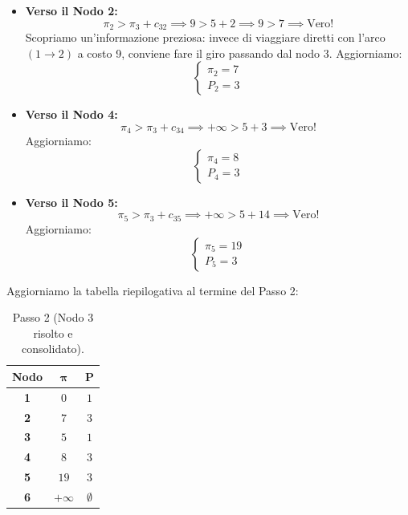 \documentclass[12pt, a4paper]{article}
\begin{document}
	\begin{itemize}
		\item \textbf{Verso il Nodo 2:} 
		\[
		\pi_2 > \pi_3 + c_{32} \implies 9 > 5 + 2 \implies 9 > 7 \implies \text{Vero!}
		\]
		Scopriamo un'informazione preziosa: invece di viaggiare diretti con l'arco $(1\to2)$ a costo 9, conviene fare il giro passando dal nodo 3. Aggiorniamo:
		\[
		\begin{cases}
			\pi_2 = 7 \\
			P_2 = 3
		\end{cases}
		\]
		
		\item \textbf{Verso il Nodo 4:} 
		\[
		\pi_4 > \pi_3 + c_{34} \implies +\infty > 5 + 3 \implies \text{Vero!}
		\]
		Aggiorniamo:
		\[
		\begin{cases}
			\pi_4 = 8 \\
			P_4 = 3
		\end{cases}
		\]
		
		\item \textbf{Verso il Nodo 5:} 
		\[
		\pi_5 > \pi_3 + c_{35} \implies +\infty > 5 + 14 \implies \text{Vero!}
		\]
		Aggiorniamo:
		\[
		\begin{cases}
			\pi_5 = 19 \\
			P_5 = 3
		\end{cases}
		\]
	\end{itemize}
	Aggiorniamo la tabella riepilogativa al termine del Passo 2:
	\begin{table}[H]
		\centering
		\begin{tabular}{|c|c|c|}
			\hline
			\textbf{Nodo} & $\boldsymbol{\pi}$ & $\mathbf{P}$ \\
			\hline
			\rowcolor{titlecolor!20} \textbf{1} & $0$ & $1$ \\
			\textbf{2} & $7$ & $3$ \\
			\rowcolor{titlecolor!20} \textbf{3} & $5$ & $1$ \\
			\textbf{4} & $8$ & $3$ \\
			\textbf{5} & $19$ & $3$ \\
			\textbf{6} & $+\infty$ & $\emptyset$ \\
			\hline
		\end{tabular}
		\caption*{Passo 2 (Nodo 3 risolto e consolidato).}
	\end{table}
	
\end{document}

